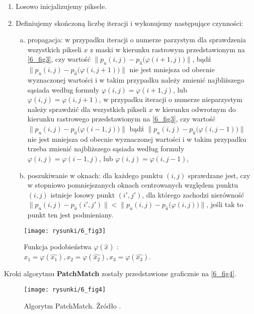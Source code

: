 \documentclass[12pt, twoside, openany]{report}
\theoremstyle{definition}
\begin{document}
\begin{enumerate}
\item
Losowo inicjalizujemy piksele.
\item
Definiujemy skończoną liczbę iteracji i wykonujemy następujące czynności:
\begin{enumerate}[a)]
\item
propagacja: w przypadku iteracji o numerze parzystym dla sprawdzenia wszystkich pikseli $x$ z maski w kierunku rastrowym przedstawionym na \autoref{6_fig3}, czy 
wartość $\big\| p_u(i,j) - p_{\hat{u}}\big(\varphi(i+1,j)\big) \big\|$, bądź $\big\| p_{u}(i,j) - p_{\hat{u}}\big(\varphi(i,j+1)\big) \big\|$ nie jest mniejsza od obecnie wyznaczonej wartości i w takim przypadku należy zmienić najbliższego sąsiada według formuły $\varphi(i,j) = \varphi(i+1,j)$, lub $\varphi(i,j) = \varphi(i,j+1)$, 
w przypadku iteracji o numerze nieparzystym należy sprawdzić dla wszystkich pikseli $x$ w kierunku odwrotnym do kierunku rastrowego przedstawionym na \autoref{6_fig3}, czy 
wartość $\big\| p_{u}(i,j) - p_{\hat{u}}\big(\varphi(i-1,j)\big) \big\|$ bądź $\big\| p_{u}(i,j) - p_{\hat{u}}\big(\varphi(i,j-1)\big) \big\|$ nie jest mniejsza od obecnie wyznaczonej wartości i w takim przypadku trzeba zmienić najbliższego sąsiada według formuły $\varphi(i,j) = \varphi(i-1,j)$, lub $\varphi(i,j) = \varphi(i,j-1)$,
\item
poszukiwanie w oknach: dla każdego punktu $(i,j)$ sprawdzane jest, czy w stopniowo pomniejszanych oknach centrowanych względem punktu $(i,j)$ istnieje losowy punkt $(i', j')$, dla którego zachodzi nierówność $\big\| p_{u}(i,j) - p_{\hat{u}}(i',j') \big\| < \big\| p_{u}(i,j) - p_{\hat{u}}\big(\varphi(i,j) \big)\big\|$, jeśli tak to punkt ten jest podmieniany.
\end{enumerate}
\end{enumerate}
\begin{figure}[!h]
	\centering
	\texttt{[image: rysunki/6\_fig3]}
	\caption{Funkcja podobieństwa $\varphi(\hat{x})$ : $x_1 = \varphi(\hat{x_1}), x_2 = \varphi(\hat{x_2}), x_3 = \varphi(\hat{x_3})$.}
	\label{6_fig3}
\end{figure}
Kroki algorytmu \textbf{PatchMatch} zostały przedstawione graficznie na \autoref{6_fig4}.
\begin{figure}[!h]
	\centering
	\texttt{[image: rysunki/6\_fig4]}
	\caption{Algorytm PatchMatch. Źródło \cite{arias2011variational}.}
	\label{6_fig4}
\end{figure}
\end{document}
